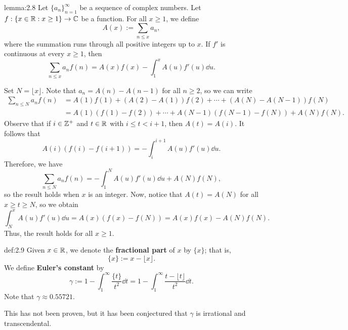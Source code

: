 \begin{lemma}{lemma:2.8}
Let $\{a_n\}_{n=1}^\infty$ be a sequence of complex numbers. 
Let $f : \{x \in \mathbb{R} : x \geq 1\} \to \mathbb{C}$ be a function. 
For all $x \geq 1$, we define 
\[ A(x) := \sum_{n\leq x} a_n, \]
where the summation runs through all positive integers up to 
$x$. If $f'$ is continuous at every $x \geq 1$, then 
\[ \sum_{n\leq x} a_n f(n) = A(x) f(x) - \int_1^x A(u)f'(u)\dd u. \]
\end{lemma}
\begin{pf}
Set $N = \lfloor x \rfloor$. Note that 
$a_n = A(n) - A(n-1)$ for all $n \geq 2$, so we can write 
\begin{align*}
    \sum_{n\leq N} a_n f(n) &= A(1)f(1) + 
    (A(2) - A(1))f(2) + \cdots + (A(N) - A(N-1)) f(N) \\
    &= A(1)(f(1) - f(2)) + \cdots + A(N-1)(f(N-1) - f(N)) + A(N)f(N).
\end{align*}
Observe that if $i \in \mathbb{Z}^+$ and $t \in \mathbb{R}$ with $i \leq t < i+1$, then $A(t) = A(i)$. 
It follows that 
\[ A(i) (f(i) - f(i+1)) = -\int_i^{i+1} A(u) f'(u)\dd u. \]
Therefore, we have 
\[ \sum_{n\leq N} a_n f(n) = -\int_1^N A(u)f'(u)\dd u + 
A(N)f(N), \]
so the result holds when $x$ is an integer. Now, notice that 
$A(t) = A(N)$ for all $x \geq t \geq N$, so we obtain 
\[ \int_N^x A(u) f'(u)\dd u = A(x)(f(x) - f(N)) = 
A(x)f(x) - A(N)f(N). \]
Thus, the result holds for all $x \geq 1$.
\end{pf}

\begin{defn}{def:2.9}
Given $x \in \mathbb{R}$, we denote the {\bf fractional part} of 
$x$ by $\{x\}$; that is, 
\[ \{x\} := x - \lfloor x \rfloor. \]
We define {\bf Euler's constant} by 
\[ \gamma := 1 - \int_1^\infty \frac{\{t\}}{t^2}\dd t 
= 1 - \int_1^\infty \frac{t - \lfloor t \rfloor}{t^2}\dd t. \]
Note that $\gamma \approx 0.55721$. 
\end{defn}

This has not been proven, but it has been conjectured that 
$\gamma$ is irrational and transcendental.


